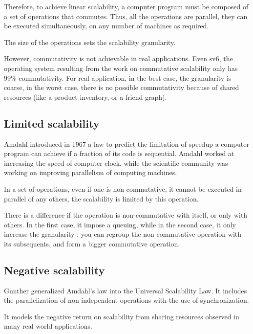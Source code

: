 Therefore, to achieve linear scalability, a computer program must be composed of a set of operations that commutes.
Thus, all the operations are parallel, they can be executed simultaneously, on any number of machines as required.

The size of the operations sets the scalability granularity.

However, commutativity is not achievable in real applications.
Even sv6, the operating system resulting from the work on commutative scalability only has 99\% commutativity.
For real application, in the best case, the granularity is coarse, in the worst case, there is no possible commutativity because of shared resources (like a product inventory, or a friend graph).


\subsection{Limited scalability}

Amdahl introduced in 1967 a law to predict the limitation of speedup a computer program can achieve if a fraction of its code is sequential.
Amdahl worked at increasing the speed of computer clock, while the scientific community was working on improving parallelism of computing machines.

In a set of operations, even if one is non-commutative, it cannot be executed in parallel of any others, the scalability is limited by this operation.

There is a difference if the operation is non-commutative with itself, or only with others.
In the first case, it impose a queuing, while in the second case, it only increase the granularity : you can regroup the non-commutative operation with its subsequents, and form a bigger commutative operation.


\subsection{Negative scalability}

Gunther generalized Amdahl's law into the Universal Scalability Law.
It includes the parallelization of non-independent operations with the use of synchronization.

It models the negative return on scalability from sharing resources observed in many real world applications.




